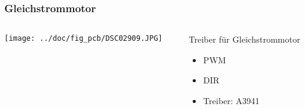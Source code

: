 \begin{frame}
    \frametitle{Gleichstrommotor}
    \begin{columns}
        \begin{column}{0.50\textwidth}
            \centering
            \texttt{[image: ../doc/fig\_pcb/DSC02909.JPG]}
        \end{column}
        \begin{column}{0.50\textwidth}
            \begin{block}{Treiber für Gleichstrommotor}
                \begin{itemize}
                    \item PWM
                    \item DIR
                    \item Treiber: A3941
                \end{itemize}
            \end{block}
        \end{column}
    \end{columns}
\end{frame}
